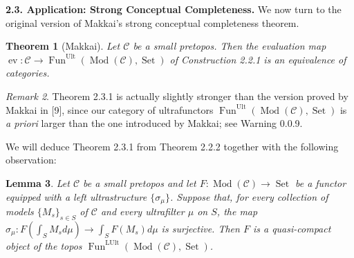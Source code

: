 \documentclass[11pt]{article}
\theoremstyle{plain}
\newtheorem{theorem}{Theorem}
\newtheorem{lemma}[theorem]{Lemma}
\theoremstyle{remark}
\newtheorem{remark}[theorem]{Remark}
\newcommand{\Mod}{\operatorname{Mod}}
\newcommand{\Set}{\operatorname{Set}}
\newcommand{\Fun}{\operatorname{Fun}}
\newcommand{\ev}{\operatorname{ev}}
\newcommand{\Ult}{\mathrm{Ult}}
\newcommand{\LUlt}{\mathrm{LUlt}}
\begin{document}

\noindent\textbf{2.3. Application: Strong Conceptual Completeness.} We now turn to the
original version of Makkai's strong conceptual completeness theorem.

\begin{theorem}[Makkai]\label{thm:2.3.1}
Let $\mathcal{C}$ be a small pretopos. Then the evaluation map
$\ev : \mathcal{C} \to \Fun^{\Ult}(\Mod(\mathcal{C}), \Set)$ of
Construction 2.2.1 is an equivalence of categories.
\end{theorem}

\begin{remark}\label{rem:2.3.2}
Theorem 2.3.1 is actually slightly stronger than the version proved by Makkai in [9], since
our category of ultrafunctors $\Fun^{\Ult}(\Mod(\mathcal{C}), \Set)$ is \emph{a priori}
larger than the one introduced by Makkai; see Warning 0.0.9.
\end{remark}


We will deduce Theorem 2.3.1 from Theorem 2.2.2 together with the following observation:


\begin{lemma}\label{lem:2.3.6}
Let $\mathcal{C}$ be a small pretopos and let $F : \Mod(\mathcal{C}) \to \Set$ be a functor
equipped with a left ultrastructure $\{\sigma_\mu\}$. Suppose that, for every collection of
models $\{M_s\}_{s \in S}$ of $\mathcal{C}$ and every ultrafilter $\mu$ on $S$, the map
$\sigma_\mu : F(\int_S M_s d\mu) \to \int_S F(M_s)d\mu$ is surjective. Then $F$ is a
quasi-compact object of the topos $\Fun^{\LUlt}(\Mod(\mathcal{C}), \Set)$.
\end{lemma}
\end{document}
